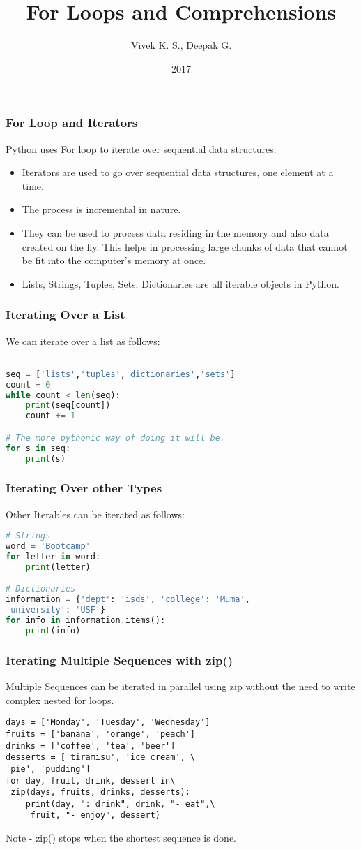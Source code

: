 \documentclass{beamer}
\title{For Loops and Comprehensions}
\author{Vivek K. S., Deepak G.}
\institute{Information Systems Decision Sciences (ISDS)\\
MUMA College of Business\\
University of South Florida \\
Tampa, Florida}
\date{2017}
\begin{document}
\frame{\titlepage}

\begin{frame}
\frametitle{For Loop and Iterators}
Python uses For loop to iterate over sequential data structures.
\begin{itemize}
\item Iterators are used to go over sequential data structures, one element at a time.
\item The process is incremental in nature.
\item They can be used to process data residing in the memory and also data created on the fly. This helps in processing large chunks of data that cannot be fit into the computer's memory at once.
\item Lists, Strings, Tuples, Sets, Dictionaries are all iterable objects in Python.
\end{itemize}
\end{frame}

\begin{frame}[fragile]
\frametitle{Iterating Over a List}
We can iterate over a list as follows:
\begin{lstlisting}[language=Python]

seq = ['lists','tuples','dictionaries','sets']
count = 0
while count < len(seq):
    print(seq[count])
    count += 1  

# The more pythonic way of doing it will be.
for s in seq:
    print(s)
\end{lstlisting}
\end{frame}

\begin{frame}[fragile]
\frametitle{Iterating Over other Types}
Other Iterables can be iterated as follows:
\begin{lstlisting}[language=Python]
# Strings
word = 'Bootcamp'
for letter in word:
	print(letter)

# Dictionaries
information = {'dept': 'isds', 'college': 'Muma',
'university': 'USF'}
for info in information.items():
    print(info)
\end{lstlisting}
\end{frame}

\begin{frame}[fragile]
\frametitle{Iterating Multiple Sequences with zip()}
Multiple Sequences can be iterated in parallel using zip without the need to write complex nested for loops.
\begin{lstlisting}
days = ['Monday', 'Tuesday', 'Wednesday']
fruits = ['banana', 'orange', 'peach']
drinks = ['coffee', 'tea', 'beer']
desserts = ['tiramisu', 'ice cream', \
'pie', 'pudding']
for day, fruit, drink, dessert in\
 zip(days, fruits, drinks, desserts):
    print(day, ": drink", drink, "- eat",\
     fruit, "- enjoy", dessert)
\end{lstlisting}

Note - zip() stops when the shortest sequence is done.
\end{frame}
\end{document}
